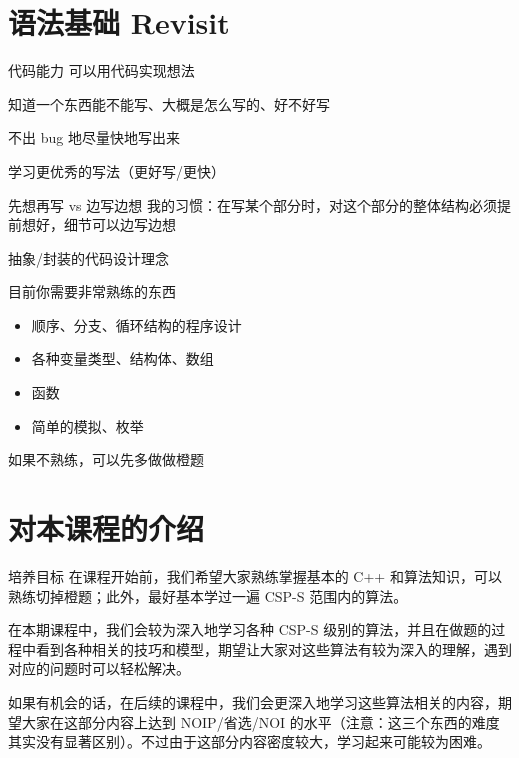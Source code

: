 \documentclass[11pt,aspectratio=169]{beamer}
\begin{document}
\section{语法基础 Revisit}

\begin{frame}{代码能力}
    可以用代码实现想法

    知道一个东西能不能写、大概是怎么写的、好不好写
    
    不出 bug 地尽量快地写出来

    学习更优秀的写法（更好写/更快）
\end{frame}

\begin{frame}{先想再写 vs 边写边想}
    我的习惯：在写某个部分时，对这个部分的整体结构必须提前想好，细节可以边写边想

    抽象/封装的代码设计理念
\end{frame}

\begin{frame}{目前你需要非常熟练的东西}
    \begin{itemize}
        \item 顺序、分支、循环结构的程序设计
        \item 各种变量类型、结构体、数组
        \item 函数
        \item 简单的模拟、枚举
    \end{itemize}

    如果不熟练，可以先多做做橙题
\end{frame}

\section{对本课程的介绍}
\begin{frame}{培养目标}
    在课程开始前，我们希望大家熟练掌握基本的 C++ 和算法知识，可以熟练切掉橙题；此外，最好基本学过一遍 CSP-S 范围内的算法。

    在本期课程中，我们会较为深入地学习各种 CSP-S 级别的算法，并且在做题的过程中看到各种相关的技巧和模型，期望让大家对这些算法有较为深入的理解，遇到对应的问题时可以轻松解决。

    如果有机会的话，在后续的课程中，我们会更深入地学习这些算法相关的内容，期望大家在这部分内容上达到 NOIP/省选/NOI 的水平（注意：这三个东西的难度其实没有显著区别）。不过由于这部分内容密度较大，学习起来可能较为困难。
\end{frame}
\end{document}
